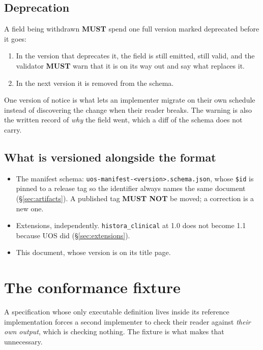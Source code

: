 \documentclass[11pt,a4paper]{article}
\newcommand{\MUST}{\textcolor{uosred}{\textbf{MUST}}}
\newcommand{\MUSTNOT}{\textcolor{uosred}{\textbf{MUST NOT}}}
\newcommand{\code}[1]{\texttt{\small #1}}
\begin{document}
\subsection{Deprecation}

A field being withdrawn \MUST{} spend one full version marked deprecated before it goes:

\begin{enumerate}
  \item In the version that deprecates it, the field is still emitted, still valid, and the
  validator \MUST{} warn that it is on its way out and say what replaces it.
  \item In the next version it is removed from the schema.
\end{enumerate}

One version of notice is what lets an implementer migrate on their own schedule instead of
discovering the change when their reader breaks. The warning is also the written record of
\emph{why} the field went, which a diff of the schema does not carry.

\subsection{What is versioned alongside the format}

\begin{itemize}
  \item The manifest schema: \code{uos-manifest-<version>.schema.json}, whose \code{\$id}
  is pinned to a release tag so the identifier always names the same document
  (\S\ref{sec:artifacts}). A published tag \MUSTNOT{} be moved; a correction is a new one.
  \item Extensions, independently. \code{histora\_clinical} at 1.0 does not become 1.1 because
  UOS did (\S\ref{sec:extensions}).
  \item This document, whose version is on its title page.
\end{itemize}

\section{The conformance fixture}\label{sec:fixture}

A specification whose only executable definition lives inside its reference implementation
forces a second implementer to check their reader against \emph{their own output}, which is
checking nothing. The fixture is what makes that unnecessary.
\end{document}
